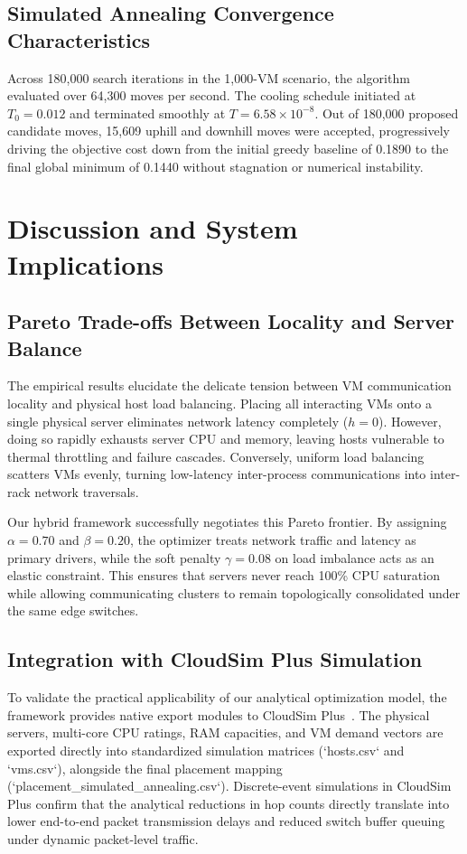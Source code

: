\documentclass[conference]{IEEEtran}
\begin{document}
\subsection{Simulated Annealing Convergence Characteristics}
Across 180,000 search iterations in the 1,000-VM scenario, the algorithm evaluated over 64,300 moves per second. The cooling schedule initiated at $T_0 = 0.012$ and terminated smoothly at $T = 6.58 \times 10^{-8}$. Out of 180,000 proposed candidate moves, 15,609 uphill and downhill moves were accepted, progressively driving the objective cost down from the initial greedy baseline of 0.1890 to the final global minimum of 0.1440 without stagnation or numerical instability.

\section{Discussion and System Implications}
\label{sec:discussion}

\subsection{Pareto Trade-offs Between Locality and Server Balance}
The empirical results elucidate the delicate tension between VM communication locality and physical host load balancing. Placing all interacting VMs onto a single physical server eliminates network latency completely ($h=0$). However, doing so rapidly exhausts server CPU and memory, leaving hosts vulnerable to thermal throttling and failure cascades. Conversely, uniform load balancing scatters VMs evenly, turning low-latency inter-process communications into inter-rack network traversals.

Our hybrid framework successfully negotiates this Pareto frontier. By assigning $\alpha = 0.70$ and $\beta = 0.20$, the optimizer treats network traffic and latency as primary drivers, while the soft penalty $\gamma = 0.08$ on load imbalance acts as an elastic constraint. This ensures that servers never reach 100\% CPU saturation while allowing communicating clusters to remain topologically consolidated under the same edge switches.

\subsection{Integration with CloudSim Plus Simulation}
To validate the practical applicability of our analytical optimization model, the framework provides native export modules to CloudSim Plus~\cite{silva2021cloudsimplus}. The physical servers, multi-core CPU ratings, RAM capacities, and VM demand vectors are exported directly into standardized simulation matrices (`hosts.csv` and `vms.csv`), alongside the final placement mapping (`placement_simulated_annealing.csv`). Discrete-event simulations in CloudSim Plus confirm that the analytical reductions in hop counts directly translate into lower end-to-end packet transmission delays and reduced switch buffer queuing under dynamic packet-level traffic.
\end{document}
